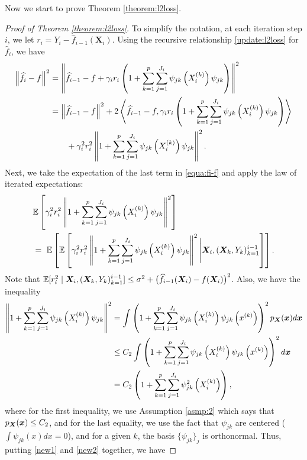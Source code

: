 Now we start to prove Theorem \ref{theorem:l2loss}.
\begin{proof}[Proof of Theorem \ref{theorem:l2loss}]
To simplify the notation, at each iteration step $i$, we let $r_i = Y_i - \hat{f}_{i-1}(\boldsymbol{X}_i)$.  Using the recursive relationship \eqref{update:l2loss} for $\hat{f}_i$, we have
\begin{align}
    \left\|\widehat{f}_i-f\right\|^2 &= \left\|\widehat{f}_{i-1}-f+\gamma_ir_i\left(1+\sum_{k=1}^p\sum_{j=1}^{J_i}\psi_{jk}\left(X_i^{(k)}\right)\psi_{jk}\right)\right\|^2 \notag\\
    &= \left\|\widehat{f}_{i-1} - f\right\|^2 + 2\left\langle \widehat{f}_{i-1}-f,\gamma_ir_i\left(1+\sum_{k=1}^p\sum_{j=1}^{J_i}\psi_{jk}\left(X_i^{(k)}\right)\psi_{jk}\right) \right\rangle \notag\\
    &\qquad +\gamma_i^2r_i^2\left\|1+\sum_{k=1}^p\sum_{j=1}^{J_i}\psi_{jk}\left(X_i^{(k)}\right)\psi_{jk}\right\|^2. \label{equa:fi-f}
\end{align}
Next, we take the expectation of the last term in \eqref{equa:fi-f} and apply the law of iterated expectations:
\begin{align}
    &\mathbb{E} \left[\gamma_i^2r_i^2\left\|1+\sum_{k=1}^p\sum_{j=1}^{J_i}\psi_{jk}\left(X_i^{(k)}\right)\psi_{jk}\right\|^2\right]\notag\\
     &=~ \mathbb{E}\left[\mathbb{E}\left[\gamma_i^2r_i^2\left\|1+\sum_{k=1}^p\sum_{j=1}^{J_i}\psi_{jk}\left(X_i^{(k)}\right)\psi_{jk}\right\|^2\Bigg|\boldsymbol{X}_i, (\boldsymbol{X}_k, Y_k)_{k=1}^{i-1}\right]\right].\label{new1}
\end{align}
Note that $\mathbb{E} [r_i^2 \mid \boldsymbol{X}_i, (\boldsymbol{X}_k, Y_k)_{k=1}^{i-1}] \leq \sigma^2 + \big(\widehat{f}_{i-1}(\boldsymbol{X}_i) - f(\boldsymbol{X}_i) \big)^2$. Also, we have the inequality
\begin{align}
    \left\|1+\sum_{k=1}^p\sum_{j=1}^{J_i}\psi_{jk}\left(X_i^{(k)}\right)\psi_{jk}\right\|^2 &= \int \left( 1+\sum_{k=1}^p\sum_{j=1}^{J_i}\psi_{jk}\left(X_i^{(k)}\right)\psi_{jk}\left(x^{(k)}\right)\right)^2p_{\bm{X}}(\boldsymbol{x})d\boldsymbol{x}\notag\\
    &\leq C_2\int \left(1+ \sum_{k=1}^p\sum_{j=1}^{J_i}\psi_{jk}\left(X_i^{(k)}\right)\psi_{jk}\left(x^{(k)}\right)\right)^2d\boldsymbol{x}\notag\\
    &=C_2\left(1+\sum_{k=1}^p\sum_{j=1}^{J_i}\psi_{jk}^2\left(X_i^{(k)}\right)\right), \label{new2}
\end{align}
where for the first inequality, we use Assumption \ref{asmp:2} which says that $p_{\bm{X}}(\boldsymbol{x}) \leq C_2$, and for the last equality, we use the fact that $\psi_{jk}$ are centered \big($\int \psi_{jk}(x) dx = 0$\big), and for a given $k$, the basis $\{\psi_{jk}\}_j$ is orthonormal. Thus, putting \eqref{new1} and \eqref{new2} together, we have

\end{proof}
